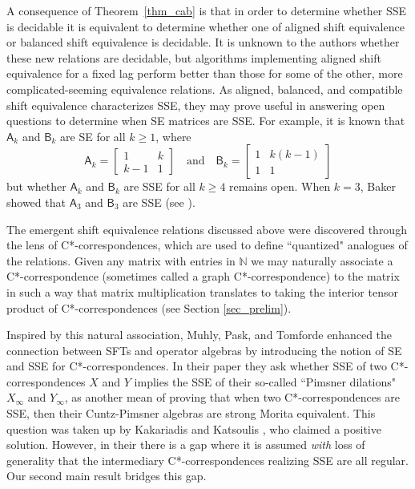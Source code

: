 \documentclass[11pt, letterpaper,final]{amsart}
\theoremstyle{definition}
\begin{document}
A consequence of Theorem~\ref{thm_cab} is that in order to determine whether SSE is decidable it is equivalent to determine whether one of aligned shift equivalence or balanced shift equivalence is decidable. It is unknown to the authors whether these new relations are decidable, but algorithms implementing aligned shift equivalence for a fixed lag perform better than those for some of the other, more complicated-seeming equivalence relations.  As aligned, balanced, and compatible shift equivalence characterizes SSE, they may prove useful in answering open questions to determine when SE matrices are SSE. For example, it is known that $\mathsf{A}_k$ and $\mathsf{B}_k$ are SE for all $k \geq 1$, where
\[
\mathsf{A}_k = \begin{bmatrix} 1 & k \\ k-1 & 1 \end{bmatrix} \quad \text{and}  \quad \mathsf{B}_k = \begin{bmatrix} 1 & k (k-1) \\ 1 & 1 \end{bmatrix}
\]
but whether $\mathsf{A}_k$ and $\mathsf{B}_k$ are SSE for all $k \geq 4$ remains open.  When $k=3$, Baker showed that $\mathsf{A}_3$ and $\mathsf{B}_3$ are SSE (see \cite[Example~7.3.12]{LM95}).  


The emergent shift equivalence relations discussed above were discovered through the lens of C*-correspondences, which are used to define ``quantized" analogues of the relations. Given any matrix with entries in $\mathbb{N}$ we may naturally associate a C*-correspondence (sometimes called a graph C*-correspondence) to the matrix in such a way that matrix multiplication translates to taking the interior tensor product of C*-correspondences (see Section \ref{sec_prelim}).  

Inspired by this natural association, Muhly, Pask, and Tomforde \cite{MPT08} enhanced the connection between SFTs and operator algebras by introducing the notion of SE and SSE for C*-correspondences. In their paper \cite[Remark 5.5]{MPT08} they ask whether SSE of two C*-correspondences $X$ and $Y$ implies the SSE of their so-called ``Pimsner dilations" $X_{\infty}$ and $Y_{\infty}$, as another mean of proving that when two C*-correspondences are SSE, then their Cuntz-Pimsner algebras are strong Morita equivalent. This question was taken up by Kakariadis and Katsoulis \cite{KK-JFA2014}, who claimed a positive solution. However, in their \cite[Theorem 5.5]{KK-JFA2014} there is a gap where it is assumed \emph{with} loss of generality that the intermediary C*-correspondences realizing SSE are all regular. Our second main result bridges this gap.
\end{document}
